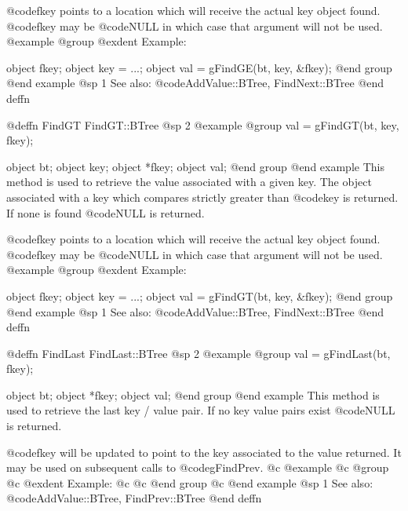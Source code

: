 @code{fkey} points to a location which will receive the actual key
object found.  @code{fkey} may be @code{NULL} in which case that
argument will not be used.
@example
@group
@exdent Example:

object  fkey;
object  key = ...;
object  val = gFindGE(bt, key, &fkey);
@end group
@end example
@sp 1
See also:  @code{AddValue::BTree, FindNext::BTree}
@end deffn







@deffn {FindGT} FindGT::BTree
@sp 2
@example
@group
val = gFindGT(bt, key, fkey);

object  bt;
object  key;
object  *fkey;
object  val;
@end group
@end example
This method is used to retrieve the value associated with a given key.
The object associated with a key which compares strictly greater than
@code{key} is returned.  If none is found @code{NULL} is returned.

@code{fkey} points to a location which will receive the actual key
object found.  @code{fkey} may be @code{NULL} in which case that
argument will not be used.
@example
@group
@exdent Example:

object  fkey;
object  key = ...;
object  val = gFindGT(bt, key, &fkey);
@end group
@end example
@sp 1
See also:  @code{AddValue::BTree, FindNext::BTree}
@end deffn















@deffn {FindLast} FindLast::BTree
@sp 2
@example
@group
val = gFindLast(bt, fkey);

object  bt;
object  *fkey;
object  val;
@end group
@end example
This method is used to retrieve the last key / value pair.  If no key
value pairs exist @code{NULL} is returned.

@code{fkey} will be updated to point to the key associated to the value
returned.  It may be used on subsequent calls to @code{gFindPrev}.
@c @example
@c @group
@c @exdent Example:
@c 
@c @end group
@c @end example
@sp 1
See also:  @code{AddValue::BTree, FindPrev::BTree}
@end deffn
























